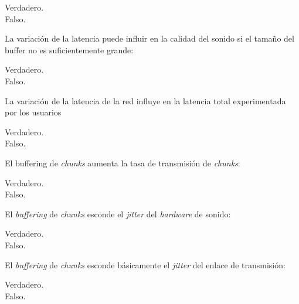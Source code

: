 \documentclass[legalpaper, 12pt, addpoints]{exam}
\begin{document}
\begin{questions}
\begin{oneparchoices}
  \choice Verdadero.\\
  \choice Falso.
\end{oneparchoices}
  
\vspace{0.10in}

\question La variación de la latencia puede influir en la calidad del
sonido si el tamaño del buffer no es suficientemente grande:

\begin{oneparchoices}
  \choice Verdadero.\\
  \choice Falso.
\end{oneparchoices}
  
\vspace{0.10in}

\question La variación de la latencia de la red influye en la latencia
total experimentada por los usuarios

\begin{oneparchoices}
  \choice Verdadero.\\
  \choice Falso.
\end{oneparchoices}
  
\vspace{0.10in}

\question El buffering de \emph{chunks} aumenta la tasa de transmisión
de \emph{chunks}:

\begin{oneparchoices}
  \choice Verdadero.\\
  \choice Falso.
\end{oneparchoices}
  
\vspace{0.10in}

\question El \emph{buffering} de \emph{chunks} esconde el
\emph{jitter} del \emph{hardware} de sonido:

\begin{oneparchoices}
  \choice Verdadero.\\
  \choice Falso.
\end{oneparchoices}
  
\vspace{0.10in}

\question El \emph{buffering} de \emph{chunks} esconde básicamente el
\emph{jitter} del enlace de transmisión:

\begin{oneparchoices}
  \choice Verdadero.\\
  \choice Falso.
\end{oneparchoices}
  

\end{questions}
\end{document}
